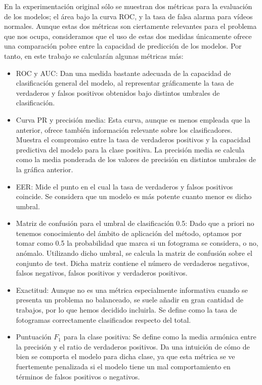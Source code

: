 \documentclass[../main.tex]{memoir}
\begin{document}
En la experimentación original sólo se muestran dos métricas para la
evaluación de los modelos; el área bajo la curva ROC, y la tasa de
falsa alarma para vídeos normales. Aunque estas dos métricas son
ciertamente relevantes para el problema que nos ocupa, consideramos
que el uso de estas dos medidas únicamente ofrece una comparación
pobre entre la capacidad de predicción de los modelos. Por tanto, en
este trabajo se calcularán algunas métricas más:

\begin{itemize}
\item ROC y AUC: Dan una medida bastante adecuada de la capacidad
  de clasificación general del modelo, al representar gráficamente
  la tasa de verdaderos y falsos positivos obtenidos bajo distintos
  umbrales de clasificación.
\item Curva PR y precisión media: Esta curva, aunque es menos empleada
  que la anterior, ofrece también información relevante sobre los
  clasificadores. Muestra el compromiso entre la tasa de verdaderos
  positivos y la capacidad predictiva del modelo para la clase
  positiva. La precisión media se calcula como la media ponderada de
  los valores de precisión en distintos umbrales de la gráfica
  anterior.
\item EER: Mide el punto en el cual la tasa de verdaderos y falsos
  positivos coincide. Se considera que un modelo es más potente cuanto
  menor es dicho umbral.
\item Matriz de confusión para el umbral de clasificación 0.5: Dado
  que a priori no tenemos conocimiento del ámbito de aplicación del
  método, optamos por tomar como 0.5 la probabilidad que marca si un
  fotograma se considera, o no, anómalo. Utilizando dicho umbral, se
  calcula la matriz de confusión sobre el conjunto de test. Dicha
  matriz contiene el número de verdaderos negativos, falsos negativos,
  falsos positivos y verdaderos positivos.
\item Exactitud: Aunque no es una métrica especialmente informativa
  cuando se presenta un problema no balanceado, se suele añadir en
  gran cantidad de trabajos, por lo que hemos decidido incluirla. Se
  define como la tasa de fotogramas correctamente clasificados
  respecto del total.
\item Puntuación $F_1$ para la clase positiva: Se define como la media
  armónica entre la precisión y el ratio de verdaderos positivos. Da
  una intuición de cómo de bien se comporta el modelo para dicha
  clase, ya que esta métrica se ve fuertemente penalizada si el modelo
  tiene un mal comportamiento en términos de falsos positivos o
  negativos.
\end{itemize}
\end{document}
